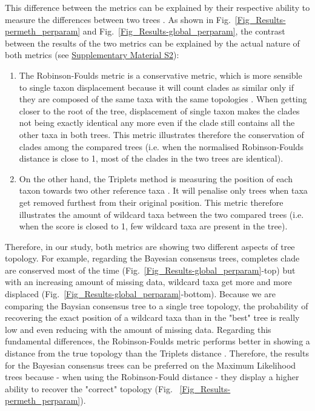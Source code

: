 \documentclass[12pt,letterpaper]{article}
\begin{document}

\label{metrics_discussion}
This difference between the metrics can be explained by their respective ability to measure the differences between two trees \citep{kuhnerpractical2014}. As shown in Fig.~\ref{Fig_Results-permeth_perparam} and Fig.~\ref{Fig_Results-global_perparam}, the contrast between the results of the two metrics can be explained by the actual nature of both metrics (see \hyperref[SupplementaryMaterial]{Supplementary Material S2}):
\begin{enumerate}
\item{The Robinson-Foulds metric is a conservative metric, which is more sensible to single taxon displacement because it will count clades as similar only if they are composed of the same taxa with the same topologies \citep{RF1981}. When getting closer to the root of the tree, displacement of single taxon makes the clades not being exactly identical any more even if the clade still contains all the other taxa in both trees. This metric illustrates therefore the conservation of clades among the compared trees (i.e. when the normalised Robinson-Foulds distance is close to 1, most of the clades in the two trees are identical).}
\item{On the other hand, the Triplets method is measuring the position of each taxon towards two other reference taxa \citep{critchlowthe1996}. It will penalise only trees when taxa get removed furthest from their original position. This metric therefore illustrates the amount of wildcard taxa \citep{kearneyfragmentary2002} between the two compared trees (i.e. when the score is closed to 1, few wildcard taxa are present in the tree).}
\end{enumerate}
Therefore, in our study, both metrics are showing two different aspects of tree topology. For example, regarding the Bayesian consensus trees, completes clade are conserved most of the time (Fig.~\ref{Fig_Results-global_perparam}-top) but with an increasing amount of missing data, wildcard taxa get more and more displaced (Fig.~\ref{Fig_Results-global_perparam}-bottom). Because we are comparing the Baysian consensus tree to a single tree topology, the probability of recovering the exact position of a wildcard taxa than in the "best" tree is really low and even reducing with the amount of missing data. Regarding this fundamental differences, the Robinson-Foulds metric performs better in showing a distance from the true topology than the Triplets distance \citep{kuhnerpractical2014}. Therefore, the results for the Bayesian consensus trees can be preferred on the Maximum Likelihood trees because - when using the Robinson-Fould distance - they display a higher ability to recover the "correct" topology (Fig. ~\ref{Fig_Results-permeth_perparam}).
\end{document}
